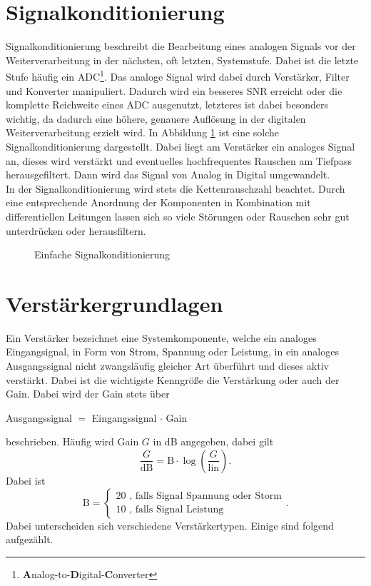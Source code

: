\section{Signalkonditionierung}\label{SignalkonditionierungKapitel}
Signalkonditionierung beschreibt die Bearbeitung eines analogen Signals vor der Weiterverarbeitung in der nächsten, oft letzten, Systemstufe. Dabei ist die letzte Stufe häufig ein ADC\footnote{\textbf{A}nalog-to-\textbf{D}igital-\textbf{C}onverter}. Das analoge Signal wird dabei durch Verstärker, Filter und Konverter manipuliert. Dadurch wird ein besseres SNR erreicht oder die komplette Reichweite eines ADC ausgenutzt, letzteres ist dabei besonders wichtig, da dadurch eine höhere, genauere Auflösung in der digitalen Weiterverarbeitung  erzielt wird. In Abbildung \ref{fig:SigCond} ist eine solche Signalkonditionierung dargestellt. Dabei liegt am Verstärker ein analoges Signal an, dieses wird verstärkt und eventuelles hochfrequentes Rauschen am Tiefpass herausgefiltert. Dann wird das Signal von Analog in Digital umgewandelt. \\
In der Signalkonditionierung wird stets die Kettenrauschzahl beachtet. Durch eine entsprechende Anordnung der Komponenten in Kombination mit differentiellen Leitungen lassen sich so viele Störungen oder Rauschen sehr gut unterdrücken oder herausfiltern. 
\begin{figure}[tbp]
  \centering
  
  \caption{Einfache Signalkonditionierung}
  \label{fig:SigCond}
\end{figure}
\section{Verstärkergrundlagen}
Ein Verstärker bezeichnet eine Systemkomponente, welche ein  analoges Eingangsignal, in Form von Strom, Spannung oder Leistung, in ein analoges Ausgangssignal nicht zwangsläufig gleicher Art überführt und dieses aktiv verstärkt. Dabei ist die wichtigste Kenngröße die Verstärkung oder auch der Gain. Dabei wird der Gain stets über 
\begin{center}
Ausgangssignal $ = $ Eingangssignal $ \cdot $ Gain
\end{center}
beschrieben. Häufig wird Gain $G$ in dB angegeben, dabei gilt
\begin{equation}
\frac{G}{\text{dB}} = \text{B} \cdot \log \left( \frac{G}{\text{lin}} \right).
\end{equation}
Dabei ist 
\begin{equation}
\text{B} = \begin{cases} 20 \text{ , falls Signal Spannung oder Storm} \\ 10 \text{ , falls Signal Leistung} \end{cases}.
\end{equation}
Dabei unterscheiden sich verschiedene Verstärkertypen. Einige sind folgend aufgezählt.

